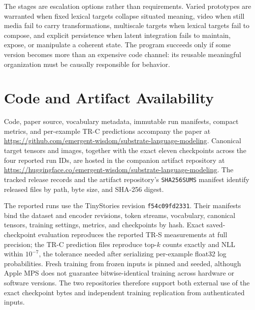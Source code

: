 \documentclass[11pt,a4paper]{article}
\begin{document}
The stages are escalation options rather than requirements. Varied prototypes are warranted when fixed lexical targets collapse situated meaning, video when still media fail to carry transformations, multiscale targets when lexical targets fail to compose, and explicit persistence when latent integration fails to maintain, expose, or manipulate a coherent state. The program succeeds only if some version becomes more than an expensive code channel: its reusable meaningful organization must be causally responsible for behavior.

\section*{Code and Artifact Availability}

Code, paper source, vocabulary metadata, immutable run manifests, compact metrics, and per-example TR-C predictions accompany the paper at \url{https://github.com/emergent-wisdom/substrate-language-modeling}. Canonical target tensors and images, together with the exact eleven checkpoints across the four reported run IDs, are hosted in the companion artifact repository at \url{https://huggingface.co/emergent-wisdom/substrate-language-modeling}. The tracked release records and the artifact repository's \texttt{SHA256SUMS} manifest identify released files by path, byte size, and SHA-256 digest.

The reported runs use the TinyStories revision \texttt{f54c09fd2331}. Their manifests bind the dataset and encoder revisions, token streams, vocabulary, canonical tensors, training settings, metrics, and checkpoints by hash. Exact saved-checkpoint evaluation reproduces the reported TR-S measurements at full precision; the TR-C prediction files reproduce top-$k$ counts exactly and NLL within $10^{-7}$, the tolerance needed after serializing per-example float32 log probabilities. Fresh training from frozen inputs is pinned and seeded, although Apple MPS does not guarantee bitwise-identical training across hardware or software versions. The two repositories therefore support both external use of the exact checkpoint bytes and independent training replication from authenticated inputs.
\end{document}
